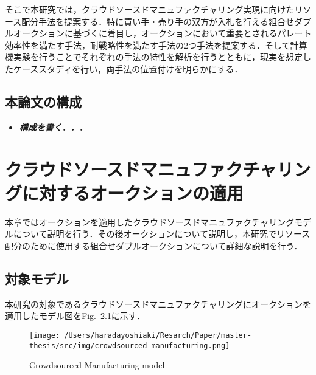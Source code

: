そこで本研究では，クラウドソースドマニュファクチャリング実現に向けたリソース配分手法を提案する．特に買い手・売り手の双方が入札を行える組合せダブルオークションに基づくに着目し，オークションにおいて重要とされるパレート効率性を満たす手法，耐戦略性を満たす手法の2つ手法を提案する．そして計算機実験を行うことでそれぞれの手法の特性を解析を行うとともに，現実を想定したケーススタディを行い，両手法の位置付けを明らかにする．

\hypertarget{ux672cux8ad6ux6587ux306eux69cbux6210}{%
\section{本論文の構成}\label{ux672cux8ad6ux6587ux306eux69cbux6210}}

\begin{itemize}
\tightlist
\item
  \textbf{\emph{構成を書く．．．}}
\end{itemize}

\hypertarget{ux30afux30e9ux30a6ux30c9ux30bdux30fcux30b9ux30c9ux30deux30cbux30e5ux30d5ux30a1ux30afux30c1ux30e3ux30eaux30f3ux30b0ux306bux5bfeux3059ux308bux30aaux30fcux30afux30b7ux30e7ux30f3ux306eux9069ux7528}{%
\chapter{クラウドソースドマニュファクチャリングに対するオークションの適用}\label{ux30afux30e9ux30a6ux30c9ux30bdux30fcux30b9ux30c9ux30deux30cbux30e5ux30d5ux30a1ux30afux30c1ux30e3ux30eaux30f3ux30b0ux306bux5bfeux3059ux308bux30aaux30fcux30afux30b7ux30e7ux30f3ux306eux9069ux7528}}

本章ではオークションを適用したクラウドソースドマニュファクチャリングモデルについて説明を行う．その後オークションについて説明し，本研究でリソース配分のために使用する組合せダブルオークションについて詳細な説明を行う．

\hypertarget{ux5bfeux8c61ux30e2ux30c7ux30eb}{%
\section{対象モデル}\label{ux5bfeux8c61ux30e2ux30c7ux30eb}}

本研究の対象であるクラウドソースドマニュファクチャリングにオークションを適用したモデル図をFig.~\ref{fig:csmfg}に示す．

\begin{figure}[H]
\hypertarget{fig:csmfg}{%
\centering
\texttt{[image: /Users/haradayoshiaki/Resarch/Paper/master-thesis/src/img/crowdsourced-manufacturing.png]}
\caption{Crowdsourced Manufacturing model}\label{fig:csmfg}
}
\end{figure}


